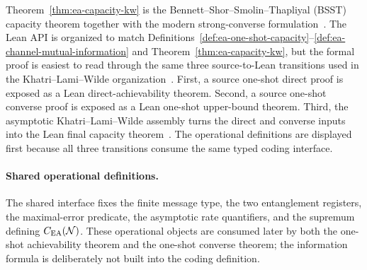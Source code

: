 \documentclass[10pt,a4paper]{article}
\begin{document}
Theorem~\ref{thm:ea-capacity-kw} is the Bennett--Shor--Smolin--Thapliyal
(BSST) capacity theorem together with the modern strong-converse formulation~\cite{Bennett1999,Bennett2002,GuptaWilde2013,KhatriLamiWilde2025Principles}. The Lean API is organized to match Definitions~\ref{def:ea-one-shot-capacity}--\ref{def:ea-channel-mutual-information} and Theorem~\ref{thm:ea-capacity-kw}, but the formal proof is easiest to read through the same three source-to-Lean transitions used in the Khatri--Lami--Wilde organization~\cite{KhatriLamiWilde2025Principles}.  First, a
source one-shot direct proof is exposed as a Lean direct-achievability
theorem.  Second, a source one-shot converse proof is exposed as a Lean
one-shot upper-bound theorem.  Third, the asymptotic Khatri--Lami--Wilde assembly
turns the direct and converse inputs into the Lean final capacity theorem~\cite{Bennett1999,Bennett2002,KhatriLamiWilde2025Principles}.  The operational
definitions are displayed first because all three transitions consume the
same typed coding interface.

\paragraph{Shared operational definitions.}
The shared interface fixes the finite message type, the two entanglement
registers, the maximal-error predicate, the asymptotic rate quantifiers, and
the supremum defining $C_{\operatorname{EA}}({\cal N})$.  These operational
objects are consumed later by both the one-shot achievability theorem and the
one-shot converse theorem; the information formula is deliberately not built
into the coding definition.
	
\end{document}
